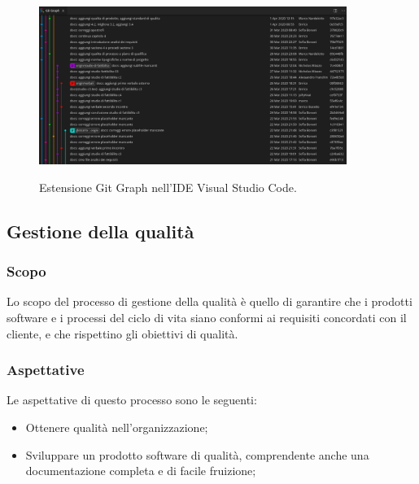 \documentclass[../norme-di-progetto.tex]{subfiles}
\begin{document}
\begin{figure}[H]
  \centering
  \includegraphics[width=10cm]{img/gitgraph.png}
  \label{fig:github}
  \caption{Estensione Git Graph nell'IDE Visual Studio Code.}
\end{figure}

\subsection{Gestione della qualità}
\subsubsection{Scopo}
Lo scopo del processo di gestione della qualità è quello di garantire che i prodotti software e i processi del ciclo di vita siano conformi ai requisiti concordati con il cliente, e che rispettino gli obiettivi di qualità.
\subsubsection{Aspettative}
Le aspettative di questo processo sono le seguenti:
\begin{itemize}
  \item Ottenere qualità nell'organizzazione;
  \item Sviluppare un prodotto software di qualità, comprendente anche una documentazione completa e di facile fruizione;
\end{itemize}
\end{document}
